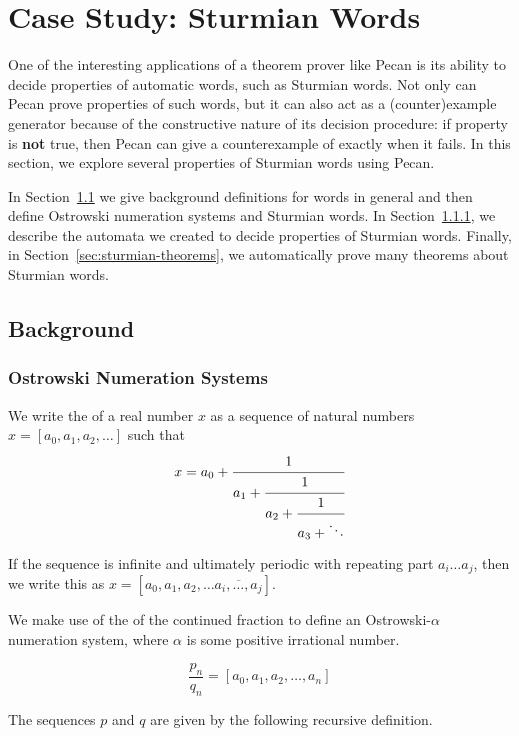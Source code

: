 \section{Case Study: Sturmian Words}\label{sec:sturmian-words}

One of the interesting applications of a theorem prover like Pecan is its ability to decide properties of automatic words, such as Sturmian words.
Not only can Pecan prove properties of such words, but it can also act as a (counter)example generator because of the constructive nature of its decision procedure: if property is \textbf{not} true, then Pecan can give a counterexample of exactly when it fails.
In this section, we explore several properties of Sturmian words using Pecan.

In Section~\ref{sec:sturmian-background} we give background definitions for words in general and then define Ostrowski numeration systems and Sturmian words.
In Section~\ref{sec:ostrowski-rep}, we describe the automata we created to decide properties of Sturmian words.
Finally, in Section~\ref{sec:sturmian-theorems}, we automatically prove many theorems about Sturmian words. 

\subsection{Background}\label{sec:sturmian-background}

\subsubsection{Ostrowski Numeration Systems}\label{sec:ostrowski-rep}
We write the  of a real number $x$ as a sequence of natural numbers  $x = [a_0,a_1,a_2,\ldots]$ such that 
\[
x = a_0+\cfrac{1}{a_1+\cfrac{1}{a_2+\cfrac{1}{a_3+\ddots}}}
\]

If the sequence is infinite and ultimately periodic with repeating part $a_i\dots a_j$, then we write this as $x = [a_0,a_1,a_2,\dots \overline{a_i,\dots,a_j}]$.

We make use of the  of the continued fraction to define an Ostrowski-$\alpha$ numeration system, where $\alpha$ is some positive irrational number.

\begin{equation*}
    \frac{p_n}{q_n} = [a_0, a_1, a_2, \ldots, a_n]
\end{equation*}

The sequences $p$ and $q$ are given by the following recursive definition.

